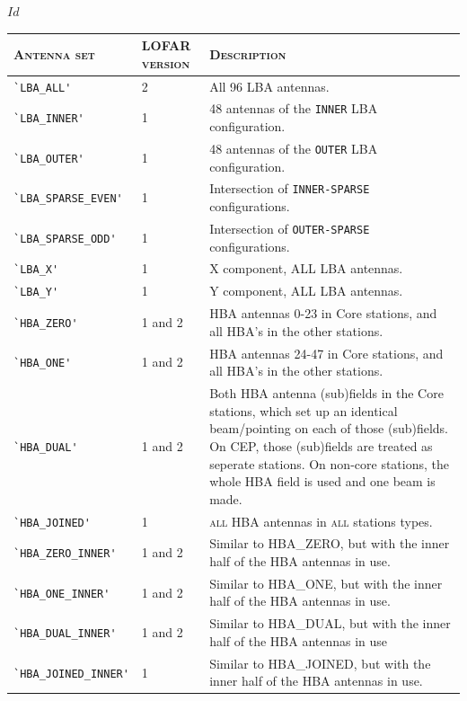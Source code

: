 \svnInfo $Id$



\begin{table}[ht]
  \centering
  \begin{tabular}{|llp{9cm}|}
    \hline
    \textsc{Antenna set}  & \textsc{LOFAR version} & \textsc{Description}\\
    \hline \hline
    \verb|`LBA_ALL'| & 2 &  All 96 LBA antennas. \\
    \verb|`LBA_INNER'| & 1 &  48 antennas of the \verb|INNER| LBA configuration. \\
    \verb|`LBA_OUTER'| & 1 & 48 antennas of the \verb|OUTER|  LBA configuration. \\
    \verb|`LBA_SPARSE_EVEN'| & 1 & Intersection of \verb|INNER-SPARSE| configurations. \\
    \verb|`LBA_SPARSE_ODD'| & 1 &  Intersection of \verb|OUTER-SPARSE| configurations. \\
    \verb|`LBA_X'| & 1 &   X component, ALL LBA antennas.   \\
    \verb|`LBA_Y'| & 1 &   Y component, ALL LBA antennas.  \\
    \verb|`HBA_ZERO'| & 1 and 2 &  HBA antennas 0-23 in Core stations, and all HBA's in the other stations. \\
    \verb|`HBA_ONE'| & 1 and 2  & HBA antennas 24-47 in Core stations, and all HBA's in the other stations. \\
    \verb|`HBA_DUAL'| & 1 and 2 & Both HBA antenna (sub)fields in the Core stations, which set up an identical 
    beam/pointing on each of those (sub)fields. On CEP, those (sub)fields are treated as seperate stations. On non-core
    stations, the whole HBA field is used and one beam is made. \\
    \verb|`HBA_JOINED'| & 1 & \textsc{all} HBA antennas in \textsc{all} stations types.  \\
    \verb|`HBA_ZERO_INNER'| & 1 and 2 & Similar to HBA\_ZERO, but with the inner half of the HBA antennas in use.  \\
    \verb|`HBA_ONE_INNER'| & 1 and 2 & Similar to HBA\_ONE, but with the inner half of the HBA antennas in use.   \\
    \verb|`HBA_DUAL_INNER'| & 1  and 2 & Similar to HBA\_DUAL, but with the inner half of the HBA antennas in use \\
    \verb|`HBA_JOINED_INNER'| & 1 & Similar to HBA\_JOINED, but with the inner half of the HBA antennas in use. \\

\end{tabular}
\end{table}

